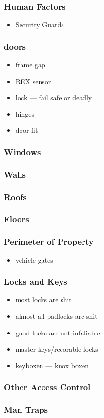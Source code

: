 \documentclass{beamer}
\begin{document}
\begin{frame}
  \frametitle{Human Factors}
\begin{itemize}
  \item Security Guards

\end{itemize}
\end{frame}

\begin{frame}
  \frametitle{doors}
  \begin{itemize}
    \item frame gap
    \item REX sensor
    \item lock --- fail safe or deadly
    \item hinges
    \item door fit
  \end{itemize}
\end{frame}

\begin{frame}
  \frametitle{Windows}
\end{frame}

\begin{frame}
  \frametitle{Walls}
\end{frame}

\begin{frame}
  \frametitle{Roofs}
\end{frame}

\begin{frame}
  \frametitle{Floors}
\end{frame}

\begin{frame}
  \frametitle{Perimeter of Property}
  \begin{itemize}
    \item vehicle gates
  \end{itemize}
\end{frame}

\begin{frame}
  \frametitle{Locks and Keys}
  \begin{itemize}
    \item most locks are shit
    \item almost all padlocks are shit
    \item good locks are not infaliable
    \item master keys/recorable locks
    \item keyboxen --- knox boxen
  \end{itemize}
\end{frame}

\begin{frame}
  \frametitle{Other Access Control}
\end{frame}

\begin{frame}
  \frametitle{Man Traps}
\end{frame}
\end{document}
